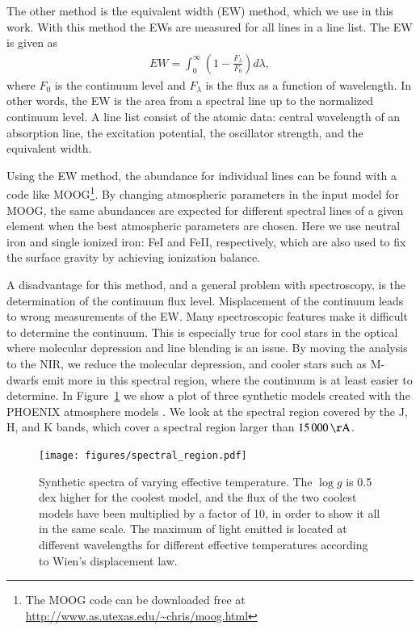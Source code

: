 \documentclass{aa}
\begin{document}
The other method is the equivalent width (EW) method, which we use in this
work. With this method the EWs are measured for all lines in a line list. The
EW is given as
\begin{align}
    \label{eq:EW}
    EW = \int_0^\infty \left(1 - \frac{F_\lambda}{F_0}\right) d\lambda,
\end{align}
where $F_0$ is the continuum level and $F_\lambda$ is the flux as a
function of wavelength. In other words, the EW is the area from a
spectral line up to the normalized continuum level. A line list consist
of the atomic data: central wavelength of an absorption line, the
excitation potential, the oscillator strength, and the equivalent width.

Using the EW method, the abundance for individual lines can be found
with a code like MOOG\footnote{The MOOG code can be downloaded free
at \url{http://www.as.utexas.edu/~chris/moog.html}}. By changing
atmospheric parameters in the input model for MOOG, the same abundances
are expected for different spectral lines of a given element when the
best atmospheric parameters are chosen. Here we use neutral iron and
single ionized iron: FeI and FeII, respectively, which are also used to
fix the surface gravity by achieving ionization balance.

A disadvantage for this method, and a general problem with spectroscopy,
is the determination of the continuum flux level. Misplacement of the
continuum leads to wrong measurements of the EW. Many spectroscopic
features make it difficult to determine the continuum. This is
especially true for cool stars in the optical where molecular depression
and line blending is an issue. By moving the analysis to the NIR, we
reduce the molecular depression, and cooler stars such as M-dwarfs
emit more in this spectral region, where the continuum is at least
easier to determine. In Figure~\ref{fig:spectral_region} we show a
plot of three synthetic models created with the PHOENIX atmosphere
models \citep{Husser2013}. We look at the spectral region covered
by the J, H, and K bands, which cover a spectral region larger than
$\SI{15000}{\AA}$.

\begin{figure}[tbp!]
    \centering
    \texttt{[image: figures/spectral\_region.pdf]}
    \caption{Synthetic spectra of varying effective temperature. The $\log g$
    is 0.5 dex higher for the coolest model, and the flux of the two coolest models
    have been multiplied by a factor of 10, in order to show it all in the same
    scale. The maximum of light emitted is located at different wavelengths for
    different effective temperatures according to Wien's displacement law.}
    \label{fig:spectral_region}
\end{figure}
\end{document}
